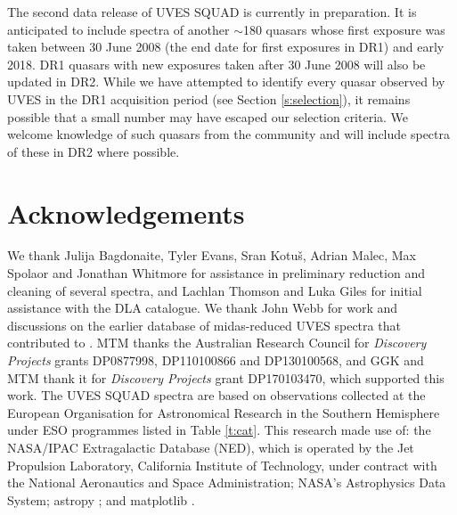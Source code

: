 \documentclass[fleqn,usenatbib,usedcolumn]{mnras}
\newcommand{\Sref}[1]{Section \ref{#1}}
\newcommand{\Tref}[1]{Table \ref{#1}}
\begin{document}
The second data release of UVES SQUAD is currently in preparation. It is anticipated to include spectra of another $\sim$180 quasars whose first exposure was taken between 30 June 2008 (the end date for first exposures in DR1) and early 2018. DR1 quasars with new exposures taken after 30 June 2008 will also be updated in DR2. While we have attempted to identify every quasar observed by UVES in the DR1 acquisition period (see \Sref{s:selection}), it remains possible that a small number may have escaped our selection criteria. We welcome knowledge of such quasars from the community and will include spectra of these in DR2 where possible.


\section*{Acknowledgements}

We thank Julija Bagdonaite, Tyler Evans, Sr\dj an Kotu\v{s}, Adrian Malec, Max Spolaor and Jonathan Whitmore for assistance in preliminary reduction and cleaning of several spectra, and Lachlan Thomson and Luka Giles for initial assistance with the DLA catalogue. We thank John Webb for work and discussions on the earlier database of {\sc midas}-reduced UVES spectra that contributed to \citet{King:2012:3370}. MTM thanks the Australian Research Council for \textsl{Discovery Projects} grants DP0877998, DP110100866 and DP130100568, and GGK and MTM thank it for \textsl{Discovery Projects} grant DP170103470, which supported this work. The UVES SQUAD spectra are based on observations collected at the European Organisation for Astronomical Research in the Southern Hemisphere under ESO programmes listed in \Tref{t:cat}. This research made use of: the NASA/IPAC Extragalactic Database (NED), which is operated by the Jet Propulsion Laboratory, California Institute of Technology, under contract with the National Aeronautics and Space Administration; NASA's Astrophysics Data System; {\sc astropy} \citep{Astropy:2013:A33}; and {\sc matplotlib} \citep{Hunter:2007:90}.










\end{document}
